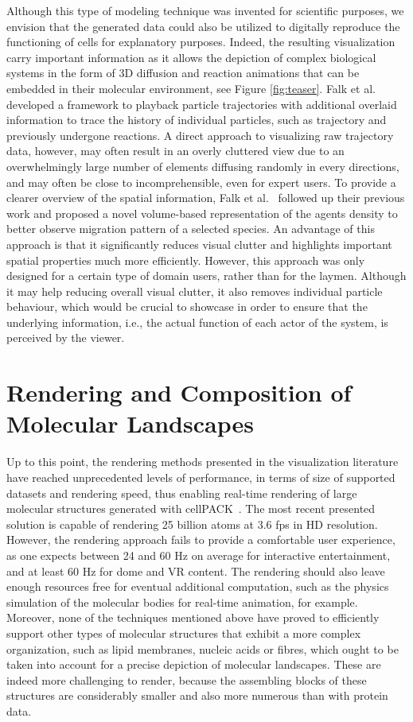 Although this type of modeling technique was invented for scientific purposes, we envision that the generated data could also be utilized to digitally reproduce the functioning of cells for explanatory purposes.
Indeed, the resulting visualization carry important information as it allows the depiction of complex biological systems in the form of 3D diffusion and reaction animations that can be embedded in their molecular environment, see Figure \ref{fig:teaser}.
Falk et al.~\cite{falk2009visualization} developed a framework to playback particle trajectories with additional overlaid information to trace the history of individual particles, such as trajectory and previously undergone reactions.
A direct approach to visualizing raw trajectory data, however, may often result in an overly cluttered view due to an overwhelmingly large number of elements diffusing randomly in every directions, and may often be close to incomprehensible, even for expert users.
To provide a clearer overview of the spatial information, Falk et al.~\cite{falk20103d} followed up their previous work and proposed a novel volume-based representation of the agents density to better observe migration pattern of a selected species.
An advantage of this approach is that it significantly reduces visual clutter and highlights important spatial properties much more efficiently.
However, this approach was only designed for a certain type of domain users, rather than for the laymen.
Although it may help reducing overall visual clutter, it also removes individual particle behaviour, which would be crucial to showcase in order to ensure that the underlying information, i.e., the actual function of each actor of the system, is perceived by the viewer.

\chapter{Rendering and Composition of Molecular Landscapes}
\label{sec:section3}

Up to this point, the rendering methods presented in the visualization literature have reached unprecedented levels of performance, in terms of size of supported datasets and rendering speed, thus enabling real-time rendering of large molecular structures generated with cellPACK~\cite{johnson2015cellpack}.
The most recent presented solution is capable of rendering 25 billion atoms at 3.6 fps in HD resolution.
However, the rendering approach fails to provide a comfortable user experience, as one expects between 24 and 60 Hz on average for interactive entertainment, and at least 60 Hz for dome and VR content.
The rendering should also leave enough resources free for eventual additional computation, such as the physics simulation of the molecular bodies for real-time animation, for example.
Moreover, none of the techniques mentioned above have proved to efficiently support other types of molecular structures that exhibit a more complex organization, such as lipid membranes, nucleic acids or fibres, which ought to be taken into account for a precise depiction of molecular landscapes.
These are indeed more challenging to render, because the assembling blocks of these structures are considerably smaller and also more numerous than with protein data.

